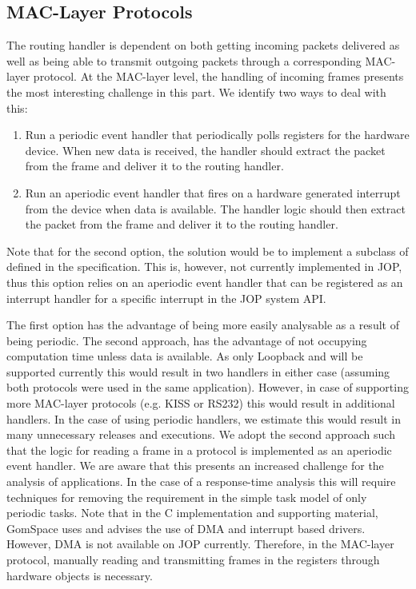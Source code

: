 \subsection{MAC-Layer Protocols}
The routing handler is dependent on both getting incoming packets delivered as well as being able to transmit outgoing packets through a corresponding MAC-layer protocol. At the MAC-layer level, the handling of incoming frames presents the most interesting challenge in this part. We identify two ways to deal with this:
\begin{enumerate}
	\item Run a periodic event handler that periodically polls registers for the hardware device. When new data is received, the handler should extract the packet from the frame and deliver it to the routing handler.
	\item Run an aperiodic event handler that fires on a hardware generated interrupt from the device when data is available. The handler logic should then extract the packet from the frame and deliver it to the routing handler.
\end{enumerate}

Note that for the second option, the solution would be to implement a subclass of  defined in the specification. This is, however, not currently implemented in JOP, thus this option relies on an aperiodic event handler that can be registered as an interrupt handler for a specific interrupt in the JOP system API.

The first option has the advantage of being more easily analysable as a result of being periodic. The second approach, has the advantage of not occupying computation time unless data is available. As only Loopback and \iic will be supported currently this would result in two handlers in either case (assuming both protocols were used in the same application). However, in case of supporting more MAC-layer protocols (e.g. KISS or RS232) this would result in additional handlers. In the case of using periodic handlers, we estimate this would result in many unnecessary releases and executions. We adopt the second approach such that the logic for reading a frame in a protocol is implemented as an aperiodic event handler. We are aware that this presents an increased challenge for the analysis of applications. In the case of a response-time analysis this will require techniques for removing the requirement in the simple task model of only periodic tasks. Note that in the C implementation and supporting material, GomSpace uses and advises the use of DMA and interrupt based drivers. However, DMA is not available on JOP currently. Therefore, in the \iic MAC-layer protocol, manually reading and transmitting frames in the registers through hardware objects is necessary.
